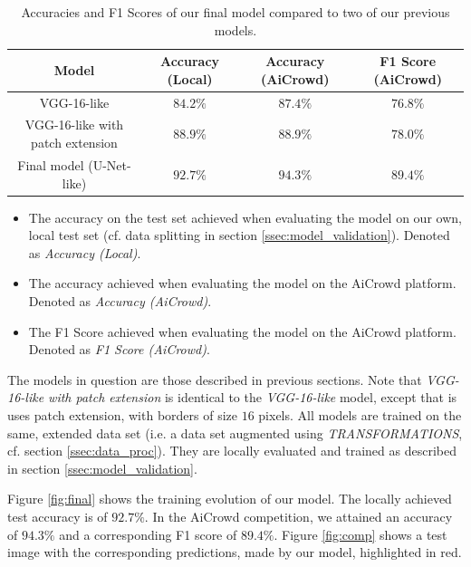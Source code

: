 \documentclass[10pt,conference,compsocconf]{IEEEtran}
\begin{document}
\begin{table}[h]
	\centering
	\begin{tabular}{ |c|c|c|c| } 
		\hline
		\textbf{Model} & \textbf{Accuracy (Local)} & \textbf{Accuracy (AiCrowd)} & \textbf{F1 Score (AiCrowd)} \\
		\hline
		VGG-16-like & $84.2\%$ & $87.4\%$ & $76.8\%$ \\ 
		VGG-16-like with patch extension & $88.9\%$ & $88.9\%$ & $78.0\%$\\ 
		Final model (U-Net-like) & $92.7\%$ & $94.3\%$ & $89.4\%$ \\ 
		\hline
	\end{tabular}
	\captionsetup{aboveskip=0.3cm,justification=centering, margin=0.1cm, labelfont=footnotesize, textfont=footnotesize}
	\caption{Accuracies and F1 Scores of our final model compared to two of our previous models.}
	\label{tab:model_accuracy}
\end{table}

\begin{itemize}
	\item The accuracy on the test set achieved when evaluating the model on our own, local test set (cf. data splitting in section \ref{ssec:model_validation}). Denoted as \textit{Accuracy (Local)}.
	\item The accuracy achieved when evaluating the model on the AiCrowd platform. Denoted as \textit{Accuracy (AiCrowd)}.
	\item The F1 Score achieved when evaluating the model on the AiCrowd platform. Denoted as \textit{F1 Score (AiCrowd)}.
\end{itemize}
The models in question are those described in previous sections. Note that \textit{VGG-16-like with patch extension} is identical to the \textit{VGG-16-like} model, except that is uses patch extension, with borders of size $16$ pixels. All models are trained on the same, extended data set (i.e. a data set augmented using \textit{TRANSFORMATIONS}, cf. section \ref{ssec:data_proc}). They are locally evaluated and trained as described in section \ref{ssec:model_validation}.

Figure \ref{fig:final} shows the training evolution of our model. The locally achieved test accuracy is of $92.7\%$. In the AiCrowd competition, we attained an accuracy of $94.3\%$ and a corresponding F1 score of $89.4\%$. Figure \ref{fig:comp} shows a test image with the corresponding predictions, made by our model, highlighted in red.
\end{document}
